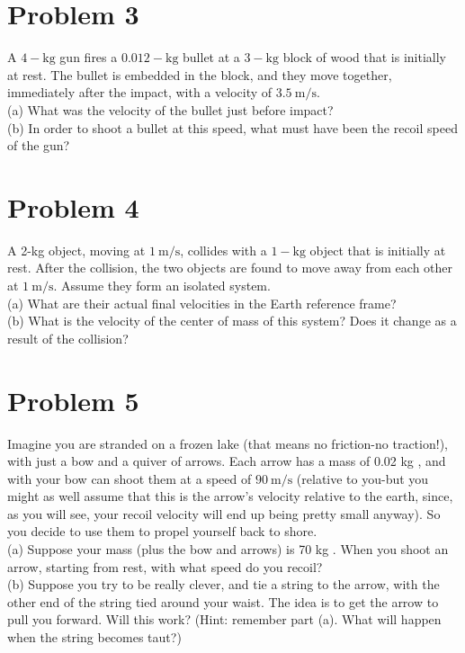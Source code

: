 \documentclass[10pt]{article}
\begin{document}
\section*{Problem 3}
A $4-\mathrm{kg}$ gun fires a $0.012-\mathrm{kg}$ bullet at a $3-\mathrm{kg}$ block of wood that is initially at rest. The bullet is embedded in the block, and they move together, immediately after the impact, with a velocity of $3.5 \mathrm{~m} / \mathrm{s}$.\\
(a) What was the velocity of the bullet just before impact?\\
(b) In order to shoot a bullet at this speed, what must have been the recoil speed of the gun?

\section*{Problem 4}
A 2-kg object, moving at $1 \mathrm{~m} / \mathrm{s}$, collides with a $1-\mathrm{kg}$ object that is initially at rest. After the collision, the two objects are found to move away from each other at $1 \mathrm{~m} / \mathrm{s}$. Assume they form an isolated system.\\
(a) What are their actual final velocities in the Earth reference frame?\\
(b) What is the velocity of the center of mass of this system? Does it change as a result of the collision?

\section*{Problem 5}
Imagine you are stranded on a frozen lake (that means no friction-no traction!), with just a bow and a quiver of arrows. Each arrow has a mass of 0.02 kg , and with your bow can shoot them at a speed of $90 \mathrm{~m} / \mathrm{s}$ (relative to you-but you might as well assume that this is the arrow's velocity relative to the earth, since, as you will see, your recoil velocity will end up being pretty small anyway). So you decide to use them to propel yourself back to shore.\\
(a) Suppose your mass (plus the bow and arrows) is 70 kg . When you shoot an arrow, starting from rest, with what speed do you recoil?\\
(b) Suppose you try to be really clever, and tie a string to the arrow, with the other end of the string tied around your waist. The idea is to get the arrow to pull you forward. Will this work? (Hint: remember part (a). What will happen when the string becomes taut?)
\end{document}
